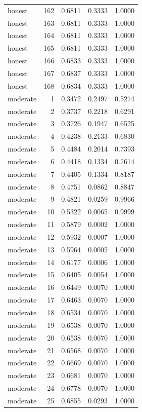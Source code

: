 \begin{tabular}{lrrrr}
honest & 162 & 0.6811 & 0.3333 & 1.0000 \\
honest & 163 & 0.6811 & 0.3333 & 1.0000 \\
honest & 164 & 0.6811 & 0.3333 & 1.0000 \\
honest & 165 & 0.6811 & 0.3333 & 1.0000 \\
honest & 166 & 0.6833 & 0.3333 & 1.0000 \\
honest & 167 & 0.6837 & 0.3333 & 1.0000 \\
honest & 168 & 0.6834 & 0.3333 & 1.0000 \\
moderate & 1 & 0.3472 & 0.2497 & 0.5274 \\
moderate & 2 & 0.3737 & 0.2218 & 0.6291 \\
moderate & 3 & 0.3726 & 0.1947 & 0.6525 \\
moderate & 4 & 0.4238 & 0.2133 & 0.6830 \\
moderate & 5 & 0.4484 & 0.2014 & 0.7393 \\
moderate & 6 & 0.4418 & 0.1334 & 0.7614 \\
moderate & 7 & 0.4405 & 0.1334 & 0.8187 \\
moderate & 8 & 0.4751 & 0.0862 & 0.8847 \\
moderate & 9 & 0.4821 & 0.0259 & 0.9966 \\
moderate & 10 & 0.5322 & 0.0065 & 0.9999 \\
moderate & 11 & 0.5879 & 0.0002 & 1.0000 \\
moderate & 12 & 0.5932 & 0.0007 & 1.0000 \\
moderate & 13 & 0.5964 & 0.0005 & 1.0000 \\
moderate & 14 & 0.6177 & 0.0006 & 1.0000 \\
moderate & 15 & 0.6405 & 0.0054 & 1.0000 \\
moderate & 16 & 0.6449 & 0.0070 & 1.0000 \\
moderate & 17 & 0.6463 & 0.0070 & 1.0000 \\
moderate & 18 & 0.6534 & 0.0070 & 1.0000 \\
moderate & 19 & 0.6538 & 0.0070 & 1.0000 \\
moderate & 20 & 0.6538 & 0.0070 & 1.0000 \\
moderate & 21 & 0.6568 & 0.0070 & 1.0000 \\
moderate & 22 & 0.6669 & 0.0070 & 1.0000 \\
moderate & 23 & 0.6681 & 0.0070 & 1.0000 \\
moderate & 24 & 0.6778 & 0.0070 & 1.0000 \\
moderate & 25 & 0.6855 & 0.0293 & 1.0000 \\

\end{tabular}
